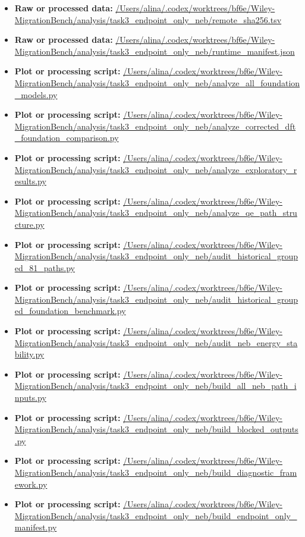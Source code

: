 \begin{itemize}[leftmargin=1.4em,noitemsep]
\item \textbf{Raw or processed data:} \url{/Users/alina/.codex/worktrees/bf6e/Wiley-MigrationBench/analysis/task3_endpoint_only_neb/remote_sha256.tsv}
\item \textbf{Raw or processed data:} \url{/Users/alina/.codex/worktrees/bf6e/Wiley-MigrationBench/analysis/task3_endpoint_only_neb/runtime_manifest.json}
\item \textbf{Plot or processing script:} \url{/Users/alina/.codex/worktrees/bf6e/Wiley-MigrationBench/analysis/task3_endpoint_only_neb/analyze_all_foundation_models.py}
\item \textbf{Plot or processing script:} \url{/Users/alina/.codex/worktrees/bf6e/Wiley-MigrationBench/analysis/task3_endpoint_only_neb/analyze_corrected_dft_foundation_comparison.py}
\item \textbf{Plot or processing script:} \url{/Users/alina/.codex/worktrees/bf6e/Wiley-MigrationBench/analysis/task3_endpoint_only_neb/analyze_exploratory_results.py}
\item \textbf{Plot or processing script:} \url{/Users/alina/.codex/worktrees/bf6e/Wiley-MigrationBench/analysis/task3_endpoint_only_neb/analyze_qe_path_structure.py}
\item \textbf{Plot or processing script:} \url{/Users/alina/.codex/worktrees/bf6e/Wiley-MigrationBench/analysis/task3_endpoint_only_neb/audit_historical_grouped_81_paths.py}
\item \textbf{Plot or processing script:} \url{/Users/alina/.codex/worktrees/bf6e/Wiley-MigrationBench/analysis/task3_endpoint_only_neb/audit_historical_grouped_foundation_benchmark.py}
\item \textbf{Plot or processing script:} \url{/Users/alina/.codex/worktrees/bf6e/Wiley-MigrationBench/analysis/task3_endpoint_only_neb/audit_neb_energy_stability.py}
\item \textbf{Plot or processing script:} \url{/Users/alina/.codex/worktrees/bf6e/Wiley-MigrationBench/analysis/task3_endpoint_only_neb/build_all_neb_path_inputs.py}
\item \textbf{Plot or processing script:} \url{/Users/alina/.codex/worktrees/bf6e/Wiley-MigrationBench/analysis/task3_endpoint_only_neb/build_blocked_outputs.py}
\item \textbf{Plot or processing script:} \url{/Users/alina/.codex/worktrees/bf6e/Wiley-MigrationBench/analysis/task3_endpoint_only_neb/build_diagnostic_framework.py}
\item \textbf{Plot or processing script:} \url{/Users/alina/.codex/worktrees/bf6e/Wiley-MigrationBench/analysis/task3_endpoint_only_neb/build_endpoint_only_manifest.py}

\end{itemize}

